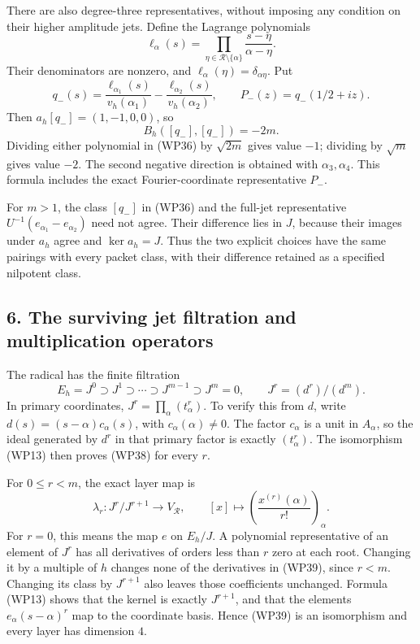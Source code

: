 \documentclass[
  10pt,
  a4paper,
]{article}
\begin{document}
There are also degree-three representatives, without imposing any
condition on their higher amplitude jets. Define the Lagrange
polynomials \[
\ell_\alpha(s)=\prod_{\eta\in\mathcal R\setminus\{\alpha\}}
\frac{s-\eta}{\alpha-\eta}.
\tag{WP35}
\] Their denominators are nonzero, and
\(\ell_\alpha(\eta)=\delta_{\alpha\eta}\). Put \[
q_-(s)=\frac{\ell_{\alpha_1}(s)}{v_h(\alpha_1)}
-\frac{\ell_{\alpha_2}(s)}{v_h(\alpha_2)},
\qquad P_-(z)=q_-(1/2+iz).
\tag{WP36}
\] Then \(a_h[q_-]=(1,-1,0,0)\), so \[
B_h([q_-],[q_-])=-2m.
\tag{WP37}
\] Dividing either polynomial in (WP36) by \(\sqrt{2m}\) gives value
\(-1\); dividing by \(\sqrt m\) gives value \(-2\). The second negative
direction is obtained with \(\alpha_3,\alpha_4\). This formula includes
the exact Fourier-coordinate representative \(P_-\).

For \(m>1\), the class \([q_-]\) in (WP36) and the full-jet
representative \(U^{-1}(e_{\alpha_1}-e_{\alpha_2})\) need not agree.
Their difference lies in \(J\), because their images under \(a_h\) agree
and \(\ker a_h=J\). Thus the two explicit choices have the same pairings
with every packet class, with their difference retained as a specified
nilpotent class.

\subsection{6. The surviving jet filtration and multiplication
operators}\label{the-surviving-jet-filtration-and-multiplication-operators}

The radical has the finite filtration \[
E_h=J^0\supset J^1\supset\cdots\supset J^{m-1}\supset J^m=0,
\qquad J^r=(d^r)/(d^m).
\tag{WP38}
\] In primary coordinates, \(J^r=\prod_\alpha(t_\alpha^r)\). To verify
this from \(d\), write \(d(s)=(s-\alpha)c_\alpha(s)\), with
\(c_\alpha(\alpha)\ne0\). The factor \(c_\alpha\) is a unit in
\(A_\alpha\), so the ideal generated by \(d^r\) in that primary factor
is exactly \((t_\alpha^r)\). The isomorphism (WP13) then proves (WP38)
for every \(r\).

For \(0\le r<m\), the exact layer map is \[
\lambda_r:J^r/J^{r+1}\longrightarrow V_{\mathcal R},
\qquad [x]\longmapsto
\left(\frac{x^{(r)}(\alpha)}{r!}\right)_\alpha.
\tag{WP39}
\] For \(r=0\), this means the map \(e\) on \(E_h/J\). A polynomial
representative of an element of \(J^r\) has all derivatives of orders
less than \(r\) zero at each root. Changing it by a multiple of \(h\)
changes none of the derivatives in (WP39), since \(r<m\). Changing its
class by \(J^{r+1}\) also leaves those coefficients unchanged. Formula
(WP13) shows that the kernel is exactly \(J^{r+1}\), and that the
elements \(e_\alpha(s-\alpha)^r\) map to the coordinate basis. Hence
(WP39) is an isomorphism and every layer has dimension \(4\).
\end{document}
